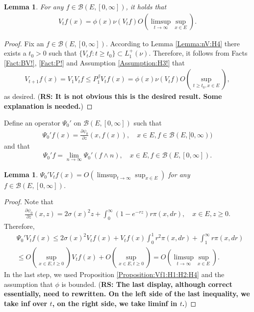 \documentclass[12pt,a4paper]{amsart}
\numberwithin{equation}{section}
\theoremstyle{plain}
\newtheorem{lem}[thm]{Lemma}
\theoremstyle{definition}
\theoremstyle{remark}
\begin{document}
\begin{lem} \label{Lemma:VfO:H4:H3}
For any $f\in \mathcal B(E,[0,\infty])$, it holds that
\begin{align}
V_tf(x)
= \phi(x) \nu(V_tf) O(\limsup_{t\to \infty} \sup_{x\in E}).
\end{align}
\end{lem}
\begin{proof}
Fix an $f\in \mathcal B(E,[0,\infty])$.
According to Lemma \ref{Lemma:nV:H4} there exists a $t_0 > 0$ such that $\{V_tf:t\geq t_0\}\subset L_1^+(\nu)$.
Therefore, it follows from Facts \ref{Fact:BV!}, \ref{Fact:P!} and Assumption \ref{Assumption:H3!} that
\begin{align}
 V_{t+1}f(x)
  = V_1 V_t f
  \leq P_1^\beta V_t f(x)
  = \phi(x) \nu(V_tf) O(\sup_{t \geq t_0, x\in E}),
  \end{align}
as desired. ({\bf RS: It is not obvious this is the desired result. Some explanation is needed.})
\end{proof}
Define an operator $\Psi_0'$ on $\mathcal B(E,[0,\infty])$ such that
\begin{align}
 \Psi_0' f(x)
 = \frac{\partial \psi_0}{ \partial z} (x, f(x)),
 \quad x\in E, f\in \mathcal B(E,[0,\infty))
 \end{align}
and that
\begin{align}
 \Psi_0' f
 = \lim_{n\to \infty} \Psi_0'(f\wedge n),
 \quad x\in E, f\in \mathcal B(E,[0,\infty]).
 \end{align}
\begin{lem} \label{Lemma:PsV:H1:H2:H4}
$\Psi_0'V_tf(x) = O(\limsup_{t\to \infty} \sup_{x\in E})$ for any $f\in \mathcal B(E, [0,\infty])$.
\end{lem}
\begin{proof}
Note that
\begin{align}
 \frac{\partial \psi_0 }{ \partial z} (x,z)
 = 2\sigma (x)^2 z + \int_0^\infty (1 - e^{- rz}) r \pi(x,dr),
 \quad x\in E, z\geq 0.
  \end{align}
Therefore,
\begin{align}
  &\Psi_0' V_tf(x)
  \leq 2\sigma (x)^2 V_t f(x) + V_t f(x) \int_0^1 r^2 \pi(x,dr) + 
  \int_1^\infty r \pi(x,dr)
  \\&\leq O(\sup_{x\in E, t\geq 0})V_tf(x) + O(\sup_{x\in E, t\geq 0})
  = O(\limsup_{t\to \infty} \sup_{x\in E} ).
  \end{align}
In the last step, we used Proposition \ref{Proposition:Vf1:H1:H2:H4} and the assumption that $\phi$ is bounded. ({\bf RS: The last display, although correct essentially, need to rewritten. On the
left side of the last inequality, we take inf over $t$, on the right side, we take liminf in $t$.})
\end{proof}
\end{document}
